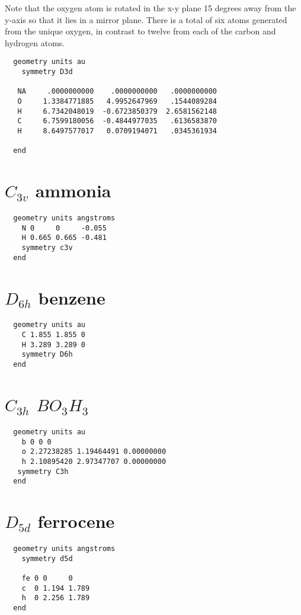  Note that the oxygen atom is rotated in the x-y plane 15
  degrees away from the y-axis so that it lies in a mirror
  plane.  There is a total of six atoms generated from the
  unique oxygen, in contrast to twelve from each of the carbon
  and hydrogen atoms.

\begin{verbatim}
  geometry units au
    symmetry D3d

   NA     .0000000000    .0000000000   .0000000000
   O     1.3384771885   4.9952647969   .1544089284
   H     6.7342048019  -0.6723850379  2.6581562148
   C     6.7599180056  -0.4844977035   .6136583870
   H     8.6497577017   0.0709194071   .0345361934

  end
\end{verbatim}

  \section{\protect$C_{3v}$ ammonia}

\begin{verbatim}
  geometry units angstroms
    N 0     0     -0.055 
    H 0.665 0.665 -0.481 
    symmetry c3v
  end
\end{verbatim}

  \section{\protect$D_{6h}$ benzene}

\begin{verbatim}
  geometry units au
    C 1.855 1.855 0 
    H 3.289 3.289 0 
    symmetry D6h
  end
\end{verbatim}

  \section{\protect$C_{3h}$ \protect$BO_3H_3$}

\begin{verbatim}
  geometry units au
    b 0 0 0 
    o 2.27238285 1.19464491 0.00000000 
    h 2.10895420 2.97347707 0.00000000 
   symmetry C3h
  end
\end{verbatim}

  \section{\protect$D_{5d}$ ferrocene}

\begin{verbatim}
  geometry units angstroms
    symmetry d5d

    fe 0 0     0 
    c  0 1.194 1.789 
    h  0 2.256 1.789 
  end
\end{verbatim}


